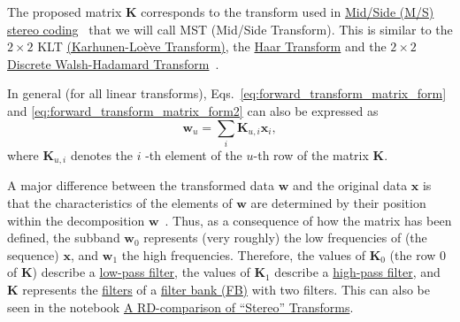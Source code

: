 The proposed matrix ${\mathbf K}$ corresponds to the transform used in
\href{https://en.wikipedia.org/wiki/Joint_encoding#M/S_stereo_coding}{Mid/Side
  (M/S) stereo coding}~\cite{bosi2003intro} that we will call MST
(Mid/Side Transform). This is similar to the $2\times 2$ KLT
\href{https://en.wikipedia.org/wiki/Kosambi%E2%80%93Karhunen%E2%80%93Lo%C3%A8ve_theorem}{(Karhunen-Lo\`eve
  Transform)}, the
\href{http://wavelets.pybytes.com/wavelet/haar/}{Haar Transform} and
the $2\times 2$
\href{https://en.wikipedia.org/wiki/Hadamard_transform}{Discrete
  Walsh-Hadamard
  Transform}~\cite{sayood2017introduction,vetterli1995wavelets}.

In general (for all linear transforms),
Eqs.~\eqref{eq:forward_transform_matrix_form} and
\eqref{eq:forward_transform_matrix_form2} can also be expressed as
\begin{equation}
  {\mathbf w}_u = \sum_i {\mathbf K}_{u,i}{\mathbf x}_i,
  \label{eq:forward_transform_linear_combination_form}
\end{equation}
where ${\mathbf K}_{u,i}$ denotes the $i$ -th element of the $u$-th row of
the matrix ${\mathbf K}$.

A major difference between the transformed data ${\mathbf w}$ and the
original data ${\mathbf x}$ is that the characteristics of the
elements of ${\mathbf w}$ are determined by their position within the
decomposition ${\mathbf w}$~\cite{sayood2017introduction}. Thus, as a
consequence of how the matrix has been defined, the subband ${\mathbf
  w}_0$ represents (very roughly) the low frequencies of (the sequence) ${\mathbf
  x}$, and ${\mathbf w}_1$ the high frequencies. Therefore, the values
of ${\mathbf K}_0$ (the row 0 of ${\mathbf K}$) describe a
\href{https://en.wikipedia.org/wiki/Low-pass_filter}{low-pass filter},
the values of ${\mathbf K}_1$ describe a
\href{https://en.wikipedia.org/wiki/High-pass_filter}{high-pass
  filter}, and ${\mathbf K}$ represents the
\href{https://en.wikipedia.org/wiki/Digital_filter}{filters} of a
\href{https://en.wikipedia.org/wiki/Filter_bank}{filter bank (FB)} with two
filters. This can also be seen in the notebook
\href{https://github.com/Tecnologias-multimedia/Tecnologias-multimedia.github.io/blob/master/contents/transform_coding/stereo_transforms_RD.ipynb}{A RD-comparison of ``Stereo'' Transforms}.

